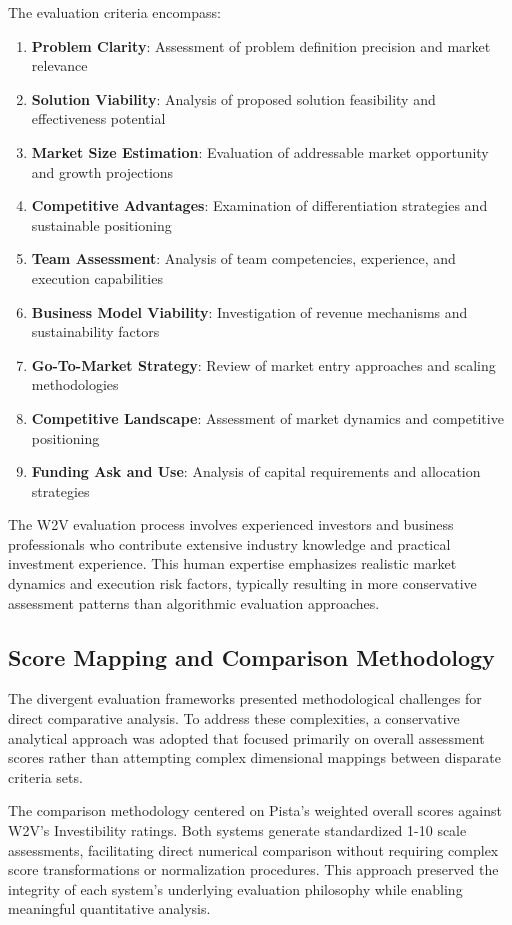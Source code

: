 The evaluation criteria encompass:
\begin{enumerate}
    \item \textbf{Problem Clarity}: Assessment of problem definition precision and market relevance
    \item \textbf{Solution Viability}: Analysis of proposed solution feasibility and effectiveness potential
    \item \textbf{Market Size Estimation}: Evaluation of addressable market opportunity and growth projections
    \item \textbf{Competitive Advantages}: Examination of differentiation strategies and sustainable positioning
    \item \textbf{Team Assessment}: Analysis of team competencies, experience, and execution capabilities
    \item \textbf{Business Model Viability}: Investigation of revenue mechanisms and sustainability factors
    \item \textbf{Go-To-Market Strategy}: Review of market entry approaches and scaling methodologies
    \item \textbf{Competitive Landscape}: Assessment of market dynamics and competitive positioning
    \item \textbf{Funding Ask and Use}: Analysis of capital requirements and allocation strategies
\end{enumerate}

The W2V evaluation process involves experienced investors and business professionals who contribute extensive industry knowledge and practical investment experience. This human expertise emphasizes realistic market dynamics and execution risk factors, typically resulting in more conservative assessment patterns than algorithmic evaluation approaches.

\subsection{Score Mapping and Comparison Methodology}
\label{subsec:methodology-approach}

The divergent evaluation frameworks presented methodological challenges for direct comparative analysis. To address these complexities, a conservative analytical approach was adopted that focused primarily on overall assessment scores rather than attempting complex dimensional mappings between disparate criteria sets.

The comparison methodology centered on Pista's weighted overall scores against W2V's Investibility ratings. Both systems generate standardized 1-10 scale assessments, facilitating direct numerical comparison without requiring complex score transformations or normalization procedures. This approach preserved the integrity of each system's underlying evaluation philosophy while enabling meaningful quantitative analysis.

